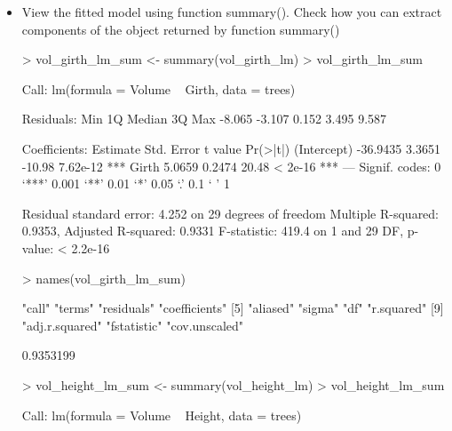 \documentclass[a4paper]{article}
\begin{document}
\begin{itemize}
\begin{Schunk}
\begin{Soutput}
(Intercept)      Height 
  -87.12361     1.54335 
\end{Soutput}
\begin{Sinput}
> head(vol_height_lm$fitted.values)
\end{Sinput}
\begin{Soutput}
       1        2        3        4        5        6 
20.91087 13.19412 10.10742 23.99757 37.88772 40.97442 
\end{Soutput}
\begin{Sinput}
> head(vol_height_lm$residuals)
\end{Sinput}
\begin{Soutput}
           1            2            3            4            5            6 
-10.61086922  -2.89412045   0.09257906  -7.59756873 -19.08771651 -21.27441602 
\end{Soutput}
\end{Schunk}
\item View the fitted model using function summary(). Check how you can extract components of the object returned by function summary()
\begin{Schunk}
\begin{Sinput}
> vol_girth_lm_sum <- summary(vol_girth_lm)
> vol_girth_lm_sum
\end{Sinput}
\begin{Soutput}
Call:
lm(formula = Volume ~ Girth, data = trees)

Residuals:
   Min     1Q Median     3Q    Max 
-8.065 -3.107  0.152  3.495  9.587 

Coefficients:
            Estimate Std. Error t value Pr(>|t|)    
(Intercept) -36.9435     3.3651  -10.98 7.62e-12 ***
Girth         5.0659     0.2474   20.48  < 2e-16 ***
---
Signif. codes:  0 ‘***’ 0.001 ‘**’ 0.01 ‘*’ 0.05 ‘.’ 0.1 ‘ ’ 1

Residual standard error: 4.252 on 29 degrees of freedom
Multiple R-squared:  0.9353,	Adjusted R-squared:  0.9331 
F-statistic: 419.4 on 1 and 29 DF,  p-value: < 2.2e-16
\end{Soutput}
\begin{Sinput}
> names(vol_girth_lm_sum)
\end{Sinput}
\begin{Soutput}
 [1] "call"          "terms"         "residuals"     "coefficients" 
 [5] "aliased"       "sigma"         "df"            "r.squared"    
 [9] "adj.r.squared" "fstatistic"    "cov.unscaled" 
\end{Soutput}
\begin{Soutput}
[1] 0.9353199
\end{Soutput}
\begin{Sinput}
> vol_height_lm_sum <- summary(vol_height_lm)
> vol_height_lm_sum
\end{Sinput}
\begin{Soutput}
Call:
lm(formula = Volume ~ Height, data = trees)


\end{Soutput}
\end{Schunk}
\end{itemize}
\end{document}
